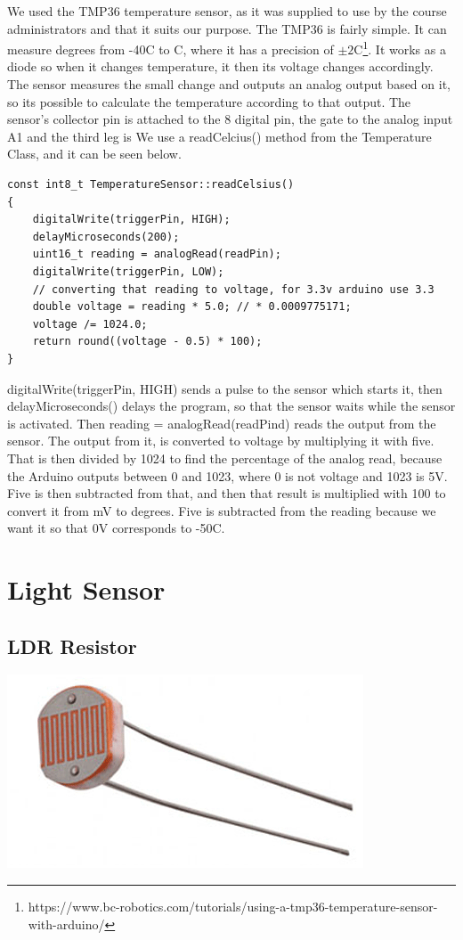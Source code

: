 \documentclass[a4paper,12pt,twoside,openright,titlepage]{book}
\begin{document}
We used the TMP36 temperature sensor, as it was supplied to use by the course administrators and that it suits our purpose. The TMP36 is fairly simple. It can measure degrees from -40\textdegree{}C to C, where it has a precision of $\pm2$\textdegree{}C\footnote{https://www.bc-robotics.com/tutorials/using-a-tmp36-temperature-sensor-with-arduino/}. It works as a diode so when it changes temperature, it then its voltage changes accordingly. The sensor measures the small change and outputs an analog output based on it, so its possible to calculate the temperature according to that output. 
The sensor's collector pin is attached to the 8 digital pin, the gate to the analog input A1 and the third leg is 
We use a readCelcius() method from the Temperature Class, and it can be seen below.
\begin{lstlisting}[language=Arduino]
const int8_t TemperatureSensor::readCelsius()
{
    digitalWrite(triggerPin, HIGH);
    delayMicroseconds(200);
    uint16_t reading = analogRead(readPin);
    digitalWrite(triggerPin, LOW);
    // converting that reading to voltage, for 3.3v arduino use 3.3
    double voltage = reading * 5.0; // * 0.0009775171;
    voltage /= 1024.0;
    return round((voltage - 0.5) * 100);
}
\end{lstlisting}
digitalWrite(triggerPin, HIGH) sends a pulse to the sensor which starts it, then delayMicroseconds() delays the program, so that the sensor waits while the sensor is activated. Then reading = analogRead(readPind) reads the output from the sensor. The output from it, is converted to voltage by multiplying it with five. That is then divided by 1024 to find the percentage of the analog read, because the Arduino outputs between 0 and 1023, where 0 is not voltage and 1023 is 5V. Five is then subtracted from that, and then that result is multiplied with 100 to convert it from mV to degrees. Five is subtracted from the reading because we want it so that 0V corresponds to -50\textdegree{}C. 

\section{Light Sensor}
\subsection{LDR Resistor}
\includegraphics[scale=0.80]{LDR-Resistor}
\end{document}

